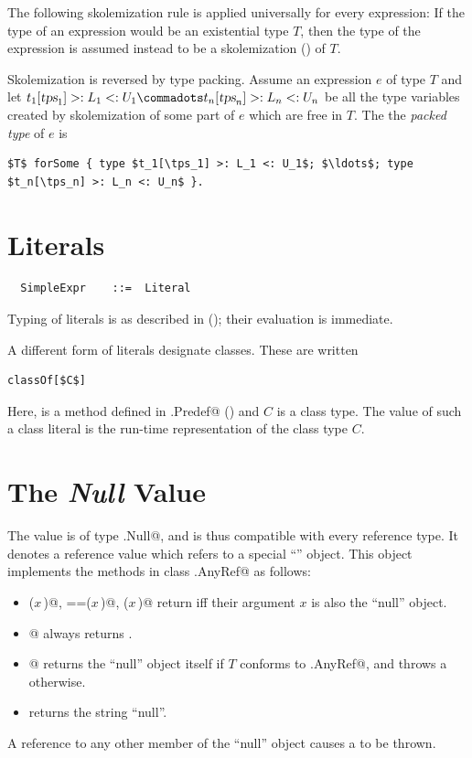 The following skolemization rule is applied universally for every
expression: If the type of an expression would be an existential type
$T$, then the type of the expression is assumed instead to be a
skolemization () of $T$.

Skolemization is reversed by type packing. Assume an expression $e$ of
type $T$ and let $t_1[\tps_1] >: L_1 <: U_1 \commadots t_n[\tps_n] >: L_n <: U_n$ be
all the type variables created by skolemization of some part of $e$ which are free in $T$.
The the {\em packed type} of $e$ is
\begin{lstlisting}
$T$ forSome { type $t_1[\tps_1] >: L_1 <: U_1$; $\ldots$; type $t_n[\tps_n] >: L_n <: U_n$ }.
\end{lstlisting}

\section{Literals}\label{sec:literal-exprs}

\syntax\begin{lstlisting}
  SimpleExpr    ::=  Literal
\end{lstlisting}

Typing of literals is as described in (); their
evaluation is immediate.

A different form of literals designate classes. These are written 
\begin{lstlisting}
classOf[$C$]
\end{lstlisting}
Here, \lstinline@classOf@ is a method defined in \lstinline@scala.Predef@
() and $C$ is a class type. The value of such a class literal is the
run-time representation of the class type $C$.

\section{The {\em Null} Value}

The  value is of type \lstinline@scala.Null@, and is thus
compatible with every reference type.  It denotes a reference value
which refers to a special ``\lstinline@null@'' object. This object
implements the methods in class \lstinline@scala.AnyRef@ as follows:
\begin{itemize}
\item
\lstinline@eq($x\,$)@, \lstinline@==($x\,$)@, \lstinline@equals($x\,$)@ return  iff their
argument $x$ is also the ``null'' object.
\item
\lstinline@isInstanceOf[$T\,$]@ always returns .
\item
\lstinline@asInstanceOf[$T\,$]@ returns the ``null'' object itself if
$T$ conforms to \lstinline@scala.AnyRef@, and throws a
\lstinline@NullPointerException@ otherwise.
\item
{} returns the string ``null''.
\end{itemize}
A reference to any other member of the ``null'' object causes a
 to be thrown. 

